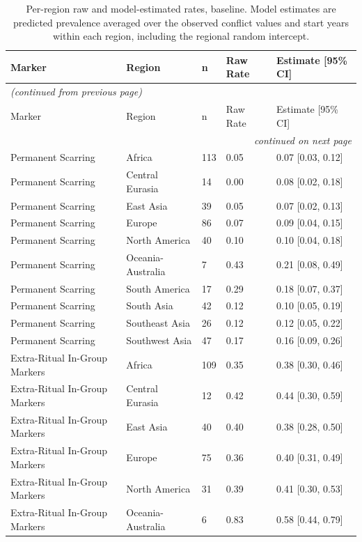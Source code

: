 \small
\begin{longtable}{lllll}
\caption{Per-region raw and model-estimated rates, baseline. Model estimates are predicted prevalence averaged over the observed conflict values and start years within each region, including the regional random intercept.} \label{tab:ext_region_effects_baseline} \\
\toprule
Marker & Region & n & Raw Rate & Estimate [95\% CI] \\
\midrule
\endfirsthead
\multicolumn{5}{l}{\small\itshape (continued from previous page)} \\
\toprule
Marker & Region & n & Raw Rate & Estimate [95\% CI] \\
\midrule
\endhead
\midrule
\multicolumn{5}{r}{\small\itshape continued on next page} \\
\endfoot
\bottomrule
\endlastfoot
Permanent Scarring & Africa & 113 & 0.05 & 0.07 [0.03, 0.12] \\
Permanent Scarring & Central Eurasia & 14 & 0.00 & 0.08 [0.02, 0.18] \\
Permanent Scarring & East Asia & 39 & 0.05 & 0.07 [0.02, 0.13] \\
Permanent Scarring & Europe & 86 & 0.07 & 0.09 [0.04, 0.15] \\
Permanent Scarring & North America & 40 & 0.10 & 0.10 [0.04, 0.18] \\
Permanent Scarring & Oceania-Australia & 7 & 0.43 & 0.21 [0.08, 0.49] \\
Permanent Scarring & South America & 17 & 0.29 & 0.18 [0.07, 0.37] \\
Permanent Scarring & South Asia & 42 & 0.12 & 0.10 [0.05, 0.19] \\
Permanent Scarring & Southeast Asia & 26 & 0.12 & 0.12 [0.05, 0.22] \\
Permanent Scarring & Southwest Asia & 47 & 0.17 & 0.16 [0.09, 0.26] \\
Extra-Ritual In-Group Markers & Africa & 109 & 0.35 & 0.38 [0.30, 0.46] \\
Extra-Ritual In-Group Markers & Central Eurasia & 12 & 0.42 & 0.44 [0.30, 0.59] \\
Extra-Ritual In-Group Markers & East Asia & 40 & 0.40 & 0.38 [0.28, 0.50] \\
Extra-Ritual In-Group Markers & Europe & 75 & 0.36 & 0.40 [0.31, 0.49] \\
Extra-Ritual In-Group Markers & North America & 31 & 0.39 & 0.41 [0.30, 0.53] \\
Extra-Ritual In-Group Markers & Oceania-Australia & 6 & 0.83 & 0.58 [0.44, 0.79] \\

\end{longtable}
